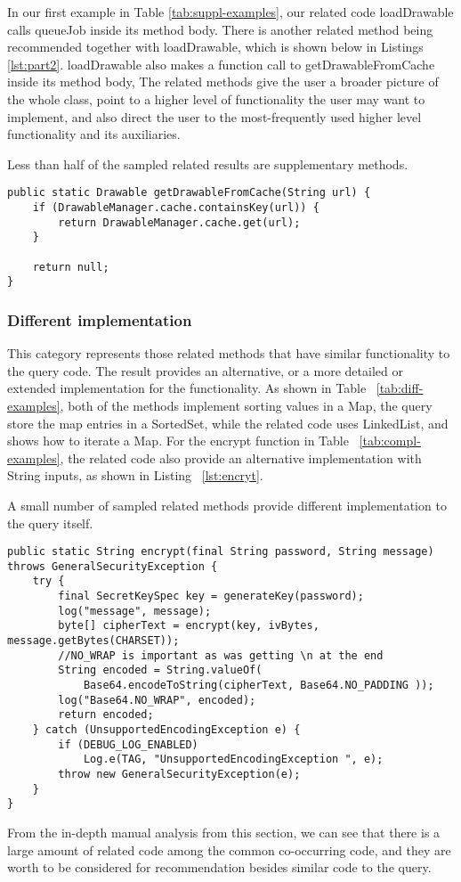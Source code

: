 In our first example in Table \ref{tab:suppl-examples}, our related code {\ttt loadDrawable} calls {\ttt queueJob} inside its method body. 
There is another related method being recommended together with {\ttt loadDrawable}, which is shown below in Listings \ref{lst:part2}. {\ttt loadDrawable} also makes a function call to {\ttt getDrawableFromCache} inside its method body, The related methods give the user a broader picture of the whole class, point to a higher level of functionality the user may want to implement, and also direct the user to the most-frequently used higher level functionality and its auxiliaries.

Less than half of the sampled related results are supplementary methods.

\lstset{
	frame=single,
}
\newpage
\begin{lstlisting}[style=MyJavaSmallStyle, caption={Related method \#2}, label={lst:part2}]
public static Drawable getDrawableFromCache(String url) {
	if (DrawableManager.cache.containsKey(url)) {
		return DrawableManager.cache.get(url);
	}
	
	return null;
}	
\end{lstlisting}


\subsubsection{Different implementation} This category represents those related methods that have similar functionality to the query code. The result provides an alternative, or a more detailed or extended implementation for the functionality. As shown in Table ~\ref{tab:diff-examples}, both of the methods implement sorting values in a {\ttt Map}, the query store the map entries in a {\ttt SortedSet}, while the related code uses {\ttt LinkedList}, and shows how to iterate a {\ttt Map}. For the {\ttt encrypt} function in Table ~\ref{tab:compl-examples}, the related code also provide an alternative implementation with {\ttt String} inputs, as shown in Listing ~\ref{lst:encryt}.

A small number of sampled related methods provide different implementation to the query itself.
\vspace{2mm}
\begin{lstlisting}[style=MyJavaSmallStyle, caption={different implementation for \texttt{encrypt}}, label={lst:encryt}]
public static String encrypt(final String password, String message) throws GeneralSecurityException {
	try {
		final SecretKeySpec key = generateKey(password);
		log("message", message);
		byte[] cipherText = encrypt(key, ivBytes, message.getBytes(CHARSET));
		//NO_WRAP is important as was getting \n at the end
		String encoded = String.valueOf(
			Base64.encodeToString(cipherText, Base64.NO_PADDING ));
		log("Base64.NO_WRAP", encoded);
		return encoded;
	} catch (UnsupportedEncodingException e) {
		if (DEBUG_LOG_ENABLED)
			Log.e(TAG, "UnsupportedEncodingException ", e);
		throw new GeneralSecurityException(e);
	}
}
\end{lstlisting}


From the in-depth manual analysis from this section, we can see that there is a large amount of related code among the common co-occurring code, and they are worth to be considered for recommendation besides similar code to the query.


